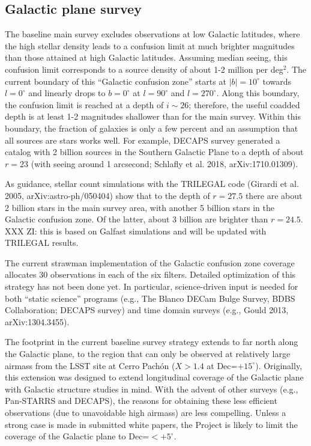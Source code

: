 \documentclass[DM,lsstdraft,toc,usenatbib]{lsstdoc}
\begin{document}
\subsection{Galactic plane survey \label{sec:GP}}

The baseline main survey excludes observations at low Galactic latitudes, where the high 
stellar density leads to a confusion limit at much brighter magnitudes than those attained 
at high Galactic latitudes. Assuming median seeing, this confusion limit corresponds to a
source density of about 1-2 million per deg$^2$. The current boundary of this ``Galactic
confusion zone'' starts at $|b|=10^\circ$ towards $l=0^\circ$ and linearly drops to $b=0^\circ$
at $l=90^\circ$ and $l=270^\circ$. Along this boundary, the confusion limit is reached at a
depth of $i \sim 26$; therefore, the useful coadded depth is at least 1-2 magnitudes 
shallower than for the main survey. Within this boundary, the fraction of galaxies is only
a few percent and an assumption that all sources are stars works well. For example, 
DECAPS survey generated a catalog with 2 billion sources in the Southern Galactic Plane
to a depth of about $r=23$ (with seeing around 1 arcsecond; Schlafly et al. 2018, 
arXiv:1710.01309). 

As guidance, stellar count simulations with the TRILEGAL code (Girardi et al. 2005, 
arXiv:astro-ph/050404) show that to the depth of $r=27.5$ there are about 2 billion
stars in the main survey area, with another 5 billion stars in the Galactic confusion 
zone. Of the latter, about 3 billion are brighter than $r=24.5$.   XXX ZI: this is based
on Galfast simulations and will be updated with TRILEGAL results. 

The current strawman implementation of the Galactic confusion zone coverage allocates 
30 observations in each of the six filters. Detailed optimization of this strategy has not 
been done yet. In particular, science-driven input is needed for both ``static science''
programs (e.g., The Blanco DECam Bulge Survey, BDBS Collaboration; DECAPS survey) 
and  time domain surveys (e.g., Gould 2013, arXiv:1304.3455). 

The footprint in the current baseline survey strategy extends to far north along the Galactic
plane, to the region that can only be observed at relatively large airmass from the LSST
site at Cerro Pach\'on ($X>1.4$ at Dec=$+15^\circ$). Originally, this extension was designed 
to extend longitudinal coverage of the Galactic plane with Galactic structure studies in mind. 
With the advent of other surveys (e.g., Pan-STARRS and DECAPS), the reasons for obtaining 
these less efficient observations (due to unavoidable high airmass) are less compelling. 
Unless a strong case is made in submitted white papers, the Project is likely to limit the 
coverage of the Galactic plane to Dec=$<+5^\circ$. 
\end{document}

